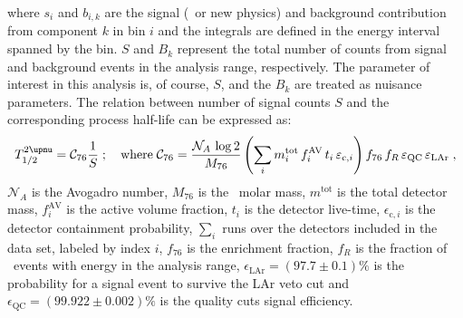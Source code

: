 where $s_i$ and $b_{i,k}$ are the signal (\nnbb\ or new physics) and background
contribution from component $k$ in bin $i$ and the integrals are defined in the energy
interval spanned by the bin. $S$ and $B_k$ represent the total number of counts from
signal and background events in the analysis range, respectively. The parameter of
interest in this analysis is, of course, $S$, and the $B_k$ are treated as nuisance
parameters. The relation between number of signal counts $S$ and the corresponding process
half-life can be expressed as:
\begin{equation}\label{eq:2nbb-ana:halflife}
  \thalftwoM = \mathcal{C}_{76} \frac{1}{S}\;;\quad
    \text{where}\; \mathcal{C}_{76} = \frac{\mathcal{N}_A\, \log2}{M_{76}}
      \left( \sum_i m^\text{tot}_i \, f^\text{AV}_i \, t_i \,
      \epsilon_{\text{c},i} \right) f_{76} \, f_R \, \epsilon_\text{QC} \, \epsilon_\text{LAr} \;,
\end{equation}
$\mathcal{N}_A$ is the Avogadro number, $M_{76}$ is the \gesix\ molar mass, $m^\text{tot}$
is the total detector mass, $f^\text{AV}_i$ is the active volume fraction, $t_i$ is the
detector live-time, $\epsilon_{\text{c},i}$ is the detector containment probability,
$\sum_i$ runs over the detectors included in the data set, labeled by index $i$, $f_{76}$
is the enrichment fraction, $f_R$ is the fraction of \nnbb\ events with energy in the
analysis range, $\epsilon_\text{LAr} = (97.7 \pm 0.1)\%$ is the probability for a signal
event to survive the LAr veto cut and $\epsilon_\text{QC} = (99.922 \pm 0.002)\%$ is the
quality cuts signal efficiency.

